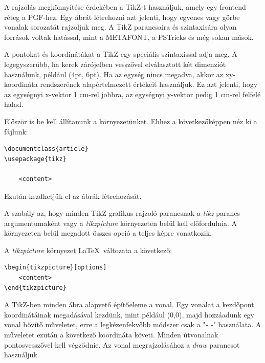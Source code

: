 

A rajzolás megkönnyítése érdekében a TikZ-t használjuk, amely egy frontend réteg a PGF-hez. Egy ábrát létrehozni azt jelenti, hogy egyenes vagy görbe vonalak sorozatát rajzoljuk meg. A TikZ parancsaira és szintaxisára olyan források voltak hatással, mint a METAFONT, a PSTricks és még sokan mások.

A pontokat és koordinátákat a TikZ egy speciális szintaxissal adja meg. A legegyszerűbb, ha kerek zárójelben vesszővel elválasztott két dimenziót használunk, például (4pt, 6pt). Ha az egység nincs megadva, akkor az xy-koordináta rendszerének alapértelmezett értékeit használjuk. Ez azt jelenti, hogy az egységnyi x-vektor 1 cm-rel jobbra, az egységnyi y-vektor pedig 1 cm-rel felfelé halad. 



Először is be kell állítanunk a környezetünket. Ehhez a következőképpen néz ki a fájlunk:

\begin{lstlisting}[style=latex]
\documentclass{article}
\usepackage{tikz}

    <content>

\end{lstlisting}

Ezután kezdhetjük el az ábrák létrehozását. 



A szabály az, hogy minden TikZ grafikus rajzoló parancsnak a \textit{tikz} parancs argumentumaként vagy a \textit{tikzpicture} környezeten belül kell előfordulnia. A környezeten belül megadott összes opció a teljes képre vonatkozik.

A \textit{tikzpicture} környezet \LaTeX\ változata a következő:

\begin{lstlisting}[style=latex]
\begin{tikzpicture}[options]
    <content>
\end{tikzpicture}
\end{lstlisting}


A TikZ-ben minden ábra alapvető építőeleme a vonal. Egy vonalat a kezdőpont koordinátáinak megadásával kezdünk, mint például (0,0), majd hozzáadunk egy vonal bővítő műveletet, erre a legkézenfekvőbb módszer csak a "\textit{- -}" használata. A műveletet ezután a következő koordináta követi. Minden útvonalnak pontosvesszővel kell végződnie. Az vonal megrajzolásához a \textit{draw} parancsot használjuk.

